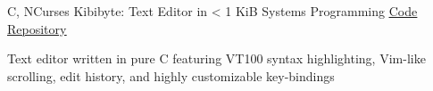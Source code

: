 \begin{cventries}
    
    
    
      \cventry
    {C, NCurses} %
    {Kibibyte: Text Editor in < 1 KiB} %
    {Systems Programming} %
    {\href{https://github.com/alizma/kilo_text_editor}{\underline{Code Repository}}} %
    {
      \begin{cvitems} %
      	\item {Text editor written in pure C featuring VT100 syntax highlighting, Vim-like scrolling, edit history, and highly customizable key-bindings}
      \end{cvitems}
    }
    

\end{cventries}